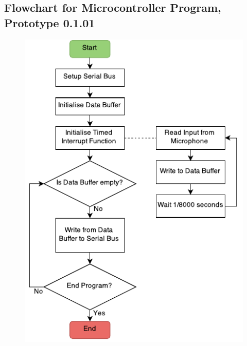 \subsection{Flowchart for Microcontroller Program, Prototype 0.1.01}
\label{mcflow}
\begin{figure}[H]
\centering
\includegraphics[scale = 1]{Images/mc0101}
\end{figure}


\newpage
